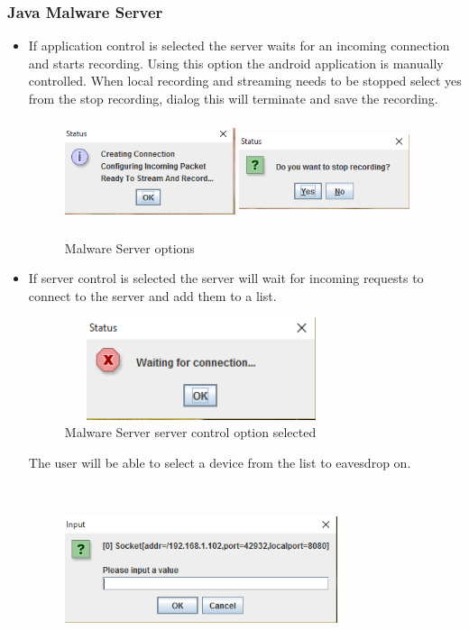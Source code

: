 \documentclass{article}
\begin{document}
\subsubsection{Java Malware Server}
\begin{itemize}
\item{If application control is selected the server waits for an incoming connection and starts recording. Using this option the android application is manually controlled. When local recording and streaming needs to be stopped select yes from the stop recording, dialog this will terminate and save the recording.
\begin{figure}[H]
\center
\includegraphics[width=5cm, height=3cm]{MalwareScreenshots/infoStatus}
\includegraphics[width=5cm, height=3cm]{MalwareScreenshots/stopRec}
\caption{Malware Server options}
\label{fig:my_label7}
\end{figure}}
\item{If server control is selected the server will wait for incoming requests to connect to the server and add them to a list. 
\begin{figure}[H]
\center
\includegraphics[width=8cm, height=3cm]{MalwareScreenshots/waiting}
\caption{Malware Server server control option selected}
\label{fig:my_label8}
\end{figure}
The user will be able to select a device from the list to eavesdrop on.
\begin{figure}[H]
\center
\includegraphics[width=8cm, height=5cm]{MalwareScreenshots/select}

\end{figure}}
\end{itemize}
\end{document}
